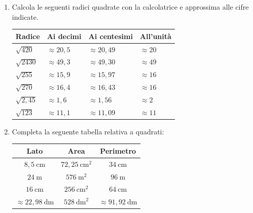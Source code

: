 \begin{enumerate}[label=\arabic*.]

    \item Calcola le seguenti radici quadrate con la calcolatrice e approssima
          alle cifre indicate.

          \begin{center}
              \begin{tabular}{llll}
                  \toprule
                  Radice            & Ai decimi          & Ai centesimi        & All'unità      \\
                  \midrule
                  \(\sqrt{420}\)    & \(\approx 20{,}5\) & \(\approx 20{,}49\) & \(\approx 20\) \\
                  \(\sqrt{2430}\)   & \(\approx 49{,}3\) & \(\approx 49{,}30\) & \(\approx 49\) \\
                  \(\sqrt{255}\)    & \(\approx 15{,}9\) & \(\approx 15{,}97\) & \(\approx 16\) \\
                  \(\sqrt{270}\)    & \(\approx 16{,}4\) & \(\approx 16{,}43\) & \(\approx 16\) \\
                  \(\sqrt{2{,}45}\) & \(\approx 1{,}6\)  & \(\approx 1{,}56\)  & \(\approx 2\)  \\
                  \(\sqrt{123}\)    & \(\approx 11{,}1\) & \(\approx 11{,}09\) & \(\approx 11\) \\
                  \bottomrule
              \end{tabular}
          \end{center}

    \item Completa la seguente tabella relativa a quadrati:

          \begin{center}
              \begin{tabular}{ccc}
                  \toprule
                  Lato                           & Area                     & Perimetro                      \\
                  \midrule
                  \(8{,}5\ \text{cm}\)           & \(72{,}25\ \text{cm}^2\) & \(34\ \text{cm}\)              \\
                  \(24\ \text{m}\)               & \(576\ \text{m}^2\)      & \(96\ \text{m}\)               \\
                  \(16\ \text{cm}\)              & \(256\ \text{cm}^2\)     & \(64\ \text{cm}\)              \\
                  \(\approx 22{,}98\ \text{dm}\) & \(528\ \text{dm}^2\)     & \(\approx 91{,}92\ \text{dm}\) \\
                  \bottomrule
              \end{tabular}
          \end{center}


\end{enumerate}
